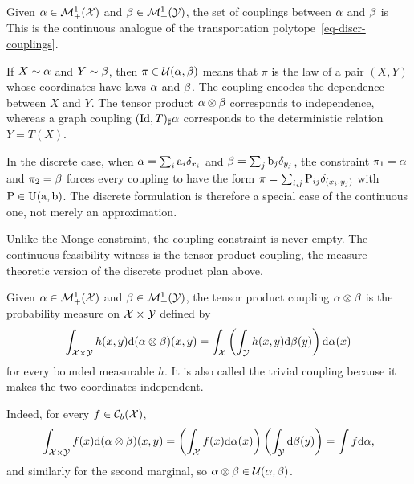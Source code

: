 \begin{defn}[Couplings]\label{def-continuous-couplings}
	Given $\alpha\in\mathcal{M}_+^1(\mathcal{X})$ and $\beta\in\mathcal{M}_+^1(\mathcal{Y})$, the set of couplings between $\alpha$ and $\beta$ is
	This is the continuous analogue of the transportation polytope~\eqref{eq-discr-couplings}.
\end{defn}

\begin{rem}
	If $X\sim\alpha$ and $Y\sim\beta$, then $\pi\in\mathcal{U}(\alpha,\beta)$ means that $\pi$ is the law of a pair $(X,Y)$ whose coordinates have laws $\alpha$ and $\beta$. The coupling encodes the dependence between $X$ and $Y$. The tensor product $\alpha\otimes\beta$ corresponds to independence, whereas a graph coupling $(\mathrm{Id},T)_\sharp\alpha$ corresponds to the deterministic relation $Y=T(X)$.

	In the discrete case, when $\alpha=\sum_i \mathrm{a}_i\delta_{x_i}$ and $\beta=\sum_j \mathrm{b}_j\delta_{y_j}$, the constraint $\pi_1=\alpha$ and $\pi_2=\beta$ forces every coupling to have the form $\pi=\sum_{i,j}\mathrm{P}_{ij}\delta_{(x_i,y_j)}$ with $\mathrm{P}\in\mathrm{U}(\mathrm{a},\mathrm{b})$. The discrete formulation is therefore a special case of the continuous one, not merely an approximation.
\end{rem}

Unlike the Monge constraint, the coupling constraint is never empty. The continuous feasibility witness is the tensor product coupling, the measure-theoretic version of the discrete product plan above.

\begin{defn}\label{def-tensor-product-coupling}
	Given $\alpha\in\mathcal{M}_+^1(\mathcal{X})$ and $\beta\in\mathcal{M}_+^1(\mathcal{Y})$, the tensor product coupling $\alpha\otimes\beta$ is the probability measure on $\mathcal{X}\times\mathcal{Y}$ defined by
	\[
		\int_{\mathcal{X}\times\mathcal{Y}} h(x,y)\mathrm{d}(\alpha\otimes\beta)(x,y)
		=
		\int_{\mathcal{X}}\left(\int_{\mathcal{Y}} h(x,y)\mathrm{d}\beta(y)\right)\mathrm{d}\alpha(x)
	\]
	for every bounded measurable $h$. It is also called the trivial coupling because it makes the two coordinates independent.
\end{defn}
Indeed, for every $f\in\mathcal{C}_b(\mathcal{X})$,
\[
	\int_{\mathcal{X}\times\mathcal{Y}} f(x)\mathrm{d}(\alpha\otimes\beta)(x,y)
	=
	\left(\int_{\mathcal{X}} f(x)\mathrm{d}\alpha(x)\right)\left(\int_{\mathcal{Y}}\mathrm{d}\beta(y)\right)
	=
	\int f\mathrm{d}\alpha,
\]
and similarly for the second marginal, so $\alpha\otimes\beta\in\mathcal{U}(\alpha,\beta)$.

